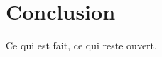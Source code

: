 \documentclass[runningheads]{llncs}
\begin{document}
\section{Conclusion}
\label{sec:conclusion}

Ce qui est fait, ce qui reste ouvert.




\end{document}
